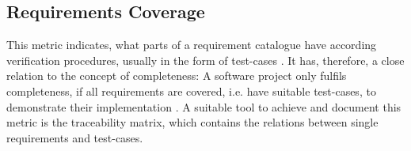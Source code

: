	\subsection{Requirements Coverage}
		This metric indicates, what parts of a requirement catalogue have according verification procedures, usually in the form of test-cases \cite{Butool2019ImprovingRC}. It has, therefore, a close relation to the concept of completeness: A software project only fulfils completeness, if all requirements are covered, i.e. have suitable test-cases, to demonstrate their implementation \cite{Marchetto2019CombiningCA}. A suitable tool to achieve and document this metric is the traceability matrix, which contains the relations between single requirements and test-cases.
	
	


